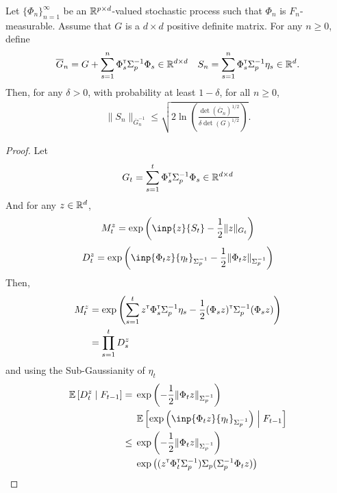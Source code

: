 \begin{subappendices}
\begin{proposition}
\begin{leftbar}[propositionbar]
		Let $\{\Phi_n\}_{n=1}^\infty$ be an $\mathbb{R}^{p\times d}$-valued stochastic process such that $\Phi_n$ is $F_n$-measurable. Assume that $G$ is a $d\times d$ positive definite matrix. For any $n\geq 0$, define
		\begin{equation*}
		\overline{G}_n = G + \sum_{s=1}^n \Phi_s^{\mathsf{\scriptscriptstyle T}} \Sigma_p^{-1} \Phi_s \in \mathbb{R}^{d\times d} \quad S_n = \sum_{s=1}^n \Phi_s^{\mathsf{\scriptscriptstyle T}}\Sigma_p^{-1}\eta_s \in \mathbb{R}^{d}.
		\end{equation*}
		Then, for any $\delta>0$, with probability at least $1-\delta$, for all $n\geq0$,
		\begin{align*}
		\| S_n \|_{\overline{G}_n^{-1}} \leq \sqrt{2\ln \left(\frac{\det\left(\overline{G}_n\right)^{1/2}}{\delta\det(G)^{1/2}}\right)}.
		\end{align*}
		\end{leftbar}
	\end{proposition}
	\begin{proof}
		Let 
		\begin{equation*}
		G_t = \sum_{s=1}^t \Phi_s^{\mathsf{\scriptscriptstyle T}} \Sigma_p^{-1} \Phi_s \in \mathbb{R}^{d\times d}
		\end{equation*}
		And for any $z\in\mathbb{R}^d$,
		\begin{equation*}
		M_t^z = \exp{\left(\inp{z}{S_t} - \frac{1}{2}\|z\|_{G_t}\right)}
		\end{equation*}
		\begin{equation*}
		D_t^z = \exp{\left(\inp{\Phi_t z}{\eta_t}_{\Sigma_p^{-1}} - \frac{1}{2}\|\Phi_t z\|_{\Sigma_p^{-1}}\right)}
		\end{equation*}
		Then,
		\begin{align*}
		M_t^z &= \exp{\left(\sum_{s=1}^t z^{\mathsf{\scriptscriptstyle T}}\Phi_s^{\mathsf{\scriptscriptstyle T}}\Sigma_p^{-1} \eta_s - \frac{1}{2} (\Phi_s z)^{\mathsf{\scriptscriptstyle T}}\Sigma_p^{-1}(\Phi_s z) \right)} \\
		&= \prod_{s=1}^{t} D_s^z
		\end{align*}
		and using the Sub-Gaussianity of $\eta_t$
		\begin{align*}
		\expectedvalue\left[D_t^z \condbar F_{t-1}\right] = {}& \exp{\left(- \frac{1}{2}\|\Phi_t z\|_{\Sigma_p^{-1}}\right)}\\ &\expectedvalue\left[\exp{\left(\inp{\Phi_t z}{\eta_t}_{\Sigma_p^{-1}}\right)} \condbar F_{t-1}\right]  \\
		\leq {} & \exp{\left(- \frac{1}{2}\|\Phi_t z\|_{\Sigma_p^{-1}}\right)}\\
		&\exp{\left((z^\transp \Phi_t^\transp \Sigma_p^{-1})\Sigma_p(\Sigma_p^{-1} \Phi_t z)\right)}\\

\end{align*}
\end{proof}
\end{subappendices}
